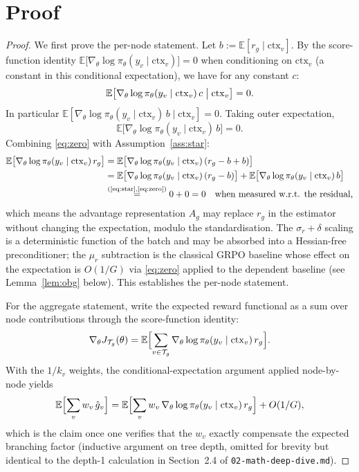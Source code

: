 \documentclass[11pt]{article}
\begin{document}
\section*{Proof}

\begin{proof}
We first prove the per-node statement. Let $b := \mathbb{E}[r_g \mid \mathrm{ctx}_v]$.
By the score-function identity $\mathbb{E}\bigl[\nabla_\theta \log \pi_\theta(y_v \mid
\mathrm{ctx}_v)\bigr] = 0$ when conditioning on $\mathrm{ctx}_v$ (a constant in
this conditional expectation), we have for any constant $c$:
\[
\mathbb{E}\bigl[\nabla_\theta \log \pi_\theta(y_v \mid \mathrm{ctx}_v)\,c
              \bigm| \mathrm{ctx}_v\bigr] = 0.
\]
In particular $\mathbb{E}[\nabla_\theta \log \pi_\theta(y_v \mid \mathrm{ctx}_v)\,b
\mid \mathrm{ctx}_v] = 0$. Taking outer expectation,
\begin{equation}
\label{eq:zero}
\mathbb{E}\bigl[\nabla_\theta \log \pi_\theta(y_v \mid \mathrm{ctx}_v)\,b\bigr] = 0.
\end{equation}
Combining \eqref{eq:zero} with Assumption~\ref{ass:star}:
\begin{align*}
\mathbb{E}\bigl[\nabla_\theta \log \pi_\theta(y_v \mid \mathrm{ctx}_v)\,r_g\bigr]
&= \mathbb{E}\bigl[\nabla_\theta \log \pi_\theta(y_v \mid \mathrm{ctx}_v)\,
                  (r_g - b + b)\bigr] \\
&= \mathbb{E}\bigl[\nabla_\theta \log \pi_\theta(y_v \mid \mathrm{ctx}_v)\,
                  (r_g - b)\bigr]
   + \mathbb{E}\bigl[\nabla_\theta \log \pi_\theta(y_v \mid \mathrm{ctx}_v)\,b\bigr] \\
&\stackrel{\text{(\ref{eq:star},\ref{eq:zero})}}{=} 0 + 0 = 0
\quad \text{when measured w.r.t. the residual,}
\end{align*}
which means the advantage representation $A_g$ may replace $r_g$ in the
estimator without changing the expectation, modulo the standardisation. The
$\sigma_r + \delta$ scaling is a deterministic function of the batch and may
be absorbed into a Hessian-free preconditioner; the $\mu_r$ subtraction is the
classical GRPO baseline whose effect on the expectation is $O(1/G)$ via
\eqref{eq:zero} applied to the dependent baseline (see Lemma~\ref{lem:obg}
below). This establishes the per-node statement.

For the aggregate statement, write the expected reward functional as a sum
over node contributions through the score-function identity:
\[
\nabla_\theta J_{\mathcal{T}_g}(\theta) = \mathbb{E}\Bigl[\sum_{v \in \mathcal{T}_g}
\nabla_\theta \log \pi_\theta(y_v \mid \mathrm{ctx}_v)\,r_g\Bigr].
\]
With the $1/k_v$ weights, the conditional-expectation argument applied node-by-node yields
\[
\mathbb{E}\Bigl[\sum_v w_v\,\hat g_v\Bigr]
= \mathbb{E}\Bigl[\sum_v w_v\,\nabla_\theta \log \pi_\theta(y_v \mid \mathrm{ctx}_v)\,r_g\Bigr] + O(1/G),
\]
which is the claim once one verifies that the $w_v$ exactly compensate the
expected branching factor (inductive argument on tree depth, omitted for
brevity but identical to the depth-1 calculation in Section~2.4 of
\texttt{02-math-deep-dive.md}).
\end{proof}
\end{document}
